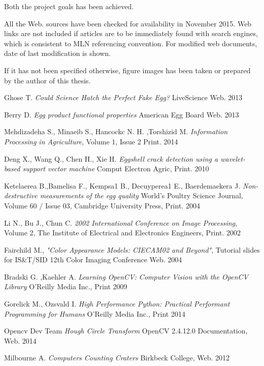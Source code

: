 \documentclass[12pt,twoside,a4paper]{article}
\begin{document}
Both the project goals has been achieved.

\newpage
All the Web. sources have been checked for availability in November 2015.
Web links are not included if articles are to be immediately found with search engines, which is consistent to MLN referencing convention.
For modified web documents, date of last modification is shown.

If it has not been specified otherwise, figure images has been taken or prepared by the author of this thesis.

\begin{thebibliography}{1}


Ghose T.
\textit{Could Science Hatch the Perfect Fake Egg?}  LiveScience Web. 2013
 
Berry D.
\textit{Egg product functional properties} 
American Egg Board Web. 2013

Mehdizadeha S., Minaeib S., Hancockc N. H. ,Torshizid M.
\textit{Information Processing in Agriculture}, Volume 1, Issue 2 
Print. 2014

Deng X., Wang Q., Chen H., Xie H.
\textit{Eggshell crack detection using a wavelet-based support vector machine} Comput Electron Agric, Print. 2010

Ketelaerea B.,Bamelisa F., Kempsa1 B., Decuyperea1 E., Baerdemaekera J.
\textit{Non-destructive measurements of the egg quality} World's Poultry Science Journal, Volume 60 / Issue 03,  Cambridge University Press, Print. 2004
 

Li N., Bu J., Chun C. 
\textit{2002 International Conference on Image Processing}, Volume 2, The Institute of Electrical and Electronics Engineers, Print. 2002

Fairchild M., 
\textit{"Color Appearance Models: CIECAM02 and Beyond"}, Tutorial slides for IS\&T/SID 12th Color Imaging Conference Web. 2004
 
Bradski G. ,Kaehler A.
\textit{Learning OpenCV: Computer Vision with the OpenCV Library} O'Reilly Media Inc., Print 2009


Gorelick M., Ozsvald I.
\textit{High Performance Python: Practical Performant Programming for Humans} O'Reilly Media Inc., Print 2014

Opencv Dev Team
\textit{Hough Circle Transform} OpenCV 2.4.12.0 Documentation, Web. 2014

Milbourne A.
\textit{Computers Counting Craters} Birkbeck College, Web. 2012


\end{thebibliography}
\end{document}
